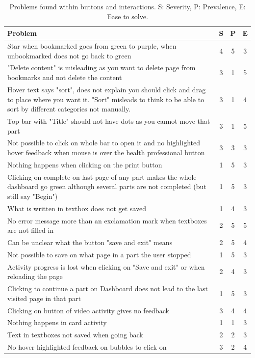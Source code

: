 \documentclass{sigchi}
\begin{document}
\begin{table}[H]
    \centering
    \begin{tabular}{|m{6.5cm}|c|c|c|}
    \hline
        \textbf{Problem} & \textbf{S} & \textbf{P} & \textbf{E}\\
    \hline
         Star when bookmarked goes from green to purple, when unbookmarked does not go back to green  & 4 & 5 & 3\\
    \hline
         "Delete content" is misleading as you want to delete page from bookmarks and not delete the content & 3 & 1 & 5\\
    \hline
         Hover text says "sort", does not explain you should click and drag to place where you want it. "Sort" misleads to think to be able to sort by different categories not manually. & 3 & 1 & 4\\
    \hline
         Top bar with "Title" should not have dots as you cannot move that part & 3 & 1 & 5\\
    \hline
         Not possible to click on whole bar to open it and no highlighted hover feedback when mouse is over the health professional button & 3 & 3 & 3\\
    \hline
         Nothing happens when clicking on the print button & 1 & 5 & 3\\
    \hline
         Clicking on complete on last page of any part makes the whole dashboard go green although several parts are not completed (but still say "Begin") & 1 & 5 & 3\\
    \hline
         What is written in textbox does not get saved & 1 & 4 & 3\\
    \hline
         No error message more than an exclamation mark when textboxes are not filled in & 2 & 5 & 5\\
    \hline
         Can be unclear what the button "save and exit" means & 2 & 5 & 4\\
    \hline
         Not possible to save on what page in a part the user stopped & 1 & 5 & 3\\
    \hline
         Activity progress is lost when clicking on "Save and exit" or when reloading the page & 2 & 4 & 3\\
    \hline
         Clicking to continue a part on Dashboard does not lead to the last visited page in that part & 1 & 5 & 3\\
    \hline
         Clicking on button of video activity gives no feedback & 3 & 4 & 4\\
    \hline
         Nothing happens in card activity & 1 & 1 & 3\\
    \hline
         Text in textboxes not saved when going back & 2 & 2 & 3\\
    \hline
         No hover highlighted feedback on bubbles to click on & 3 & 2 & 4\\
    \hline
    \end{tabular}
    \caption{Problems found within buttons and interactions. S: Severity, P: Prevalence, E: Ease to solve.}
    \label{tab:interactions}
\end{table}
\end{document}
